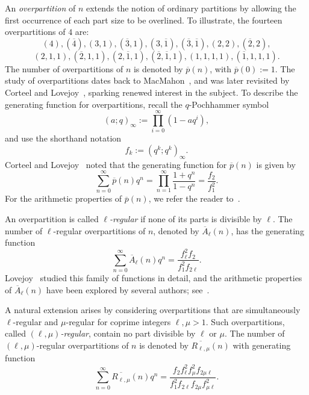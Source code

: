 \documentclass{amsart}
\theoremstyle{definition}
\begin{document}
An \textit{overpartition} of $n$ extends the notion of ordinary partitions by allowing the first occurrence of each
part size to be overlined. To illustrate, the fourteen overpartitions of $4$ are:
\[(4), (\overline{4}), (3,1), (\overline{3},1), (3,\overline{1}), (\overline{3},\overline{1}), (2,2), (\overline{2},2),\]
\[(2,1,1), (\overline{2},1,1), (2,\overline{1},1), (\overline{2},\overline{1},1), (1,1,1,1), (\overline{1},1,1,1).\]
The number of overpartitions of $n$ is denoted by $\overline{p}(n)$, with $\overline{p}(0) := 1$. The study of overpartitions dates back to MacMahon~\cite{MacMahon}, and was later revisited by Corteel and Lovejoy~\cite{Corteel-Lovejoy}, sparking renewed interest in the subject. To describe the generating function for overpartitions, recall the $q$-Pochhammer symbol
\[(a; q)_{\infty} := \prod_{i=0}^{\infty} (1 - a q^i),\] 
and use the shorthand notation 
\[f_k := (q^k; q^k)_{\infty}.\] 
Corteel and Lovejoy~\cite{Corteel-Lovejoy} noted that the generating function for $\overline{p}(n)$ is given by
\begin{equation*}
	\sum_{n = 0}^{\infty} \overline{p}(n)q^{n} = \prod_{n = 1}^{\infty} \frac{1 + q^{n}}{1 - q^{n}} = \frac{f_{2}}{f_{1}^{2}}.
\end{equation*}
For the arithmetic properties of $\overline{p}(n)$, we refer the reader to~\cite{Chen-Sun-Wang-Zhang, Fortin-Jacob-Mathieu, Hirschhorn-Sellers_2005, Mahlburg, Treneer, Xia}.

An overpartition is called \textit{$\ell$-regular} if none of its parts is divisible by $\ell$. The number of $\ell$-regular overpartitions of $n$, denoted by $\overline{A}_{\ell}(n)$, has the generating function
\begin{equation*}
	\sum_{n = 0}^{\infty} \overline{A}_{\ell}(n)q^{n} = \frac{f_{\ell}^{2}f_{2}}{f_{1}^{2} f_{2\ell}}.
\end{equation*}
Lovejoy~\cite{Lovejoy} studied this family of functions in detail, 
and the arithmetic properties of $\overline{A}_{\ell}(n)$ have been explored by several authors; see~\cite{Alanazi-Munagi-Sellers, Barman-Ray, Ray-Barman, Shen}.

A natural extension arises by considering overpartitions that are simultaneously $\ell$-regular and $\mu$-regular for coprime integers $\ell, \mu > 1$. Such overpartitions, called \textit{$(\ell, \mu)$-regular}, contain no part divisible by $\ell$ or $\mu$. The number of $(\ell, \mu)$-regular overpartitions of $n$ is denoted by $\overline{R_{\ell,\mu}}(n)$ with generating function
\begin{equation*}
	\sum_{n=0}^{\infty} \overline{R_{\ell,\mu}}(n) q^n = \frac{f_2 f_{\ell}^2 f_{\mu}^2 f_{2 \mu \ell}}{f_1^2 f_{2 \ell} f_{2 \mu} f_{\mu \ell}^2}.
\end{equation*}
\end{document}
